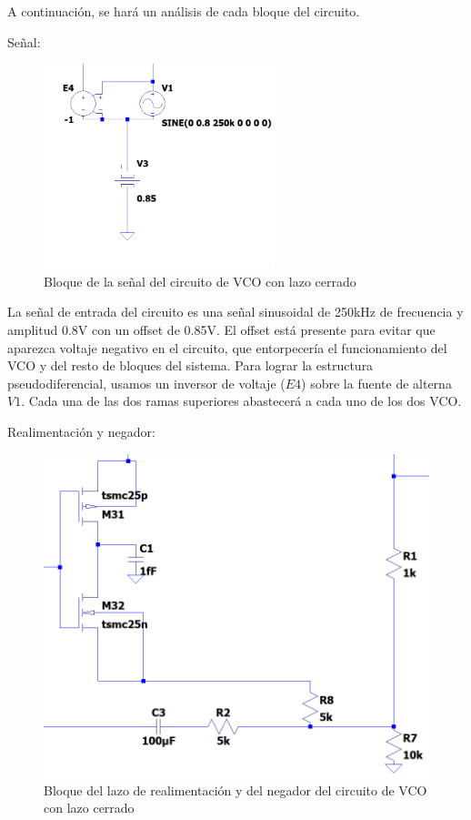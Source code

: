 \documentclass[12pt]{report} %
\begin{document}
	A continuación, se hará un análisis de cada bloque del circuito.
	
	Señal:
	
	\begin{figure}[H]
		\includegraphics[width=0.6\textwidth]{ltspice-vco-closed-signal-block.png}
		\caption[Bloque de la señal del circuito de VCO con lazo cerrado]{Bloque de la señal del circuito de VCO con lazo cerrado}
		\label{fig:ltspice-vco-closed-signal-block.png}
	\end{figure}

	La señal de entrada del circuito es una señal sinusoidal de 250kHz de frecuencia y amplitud 0.8V con un offset de 0.85V. El offset está presente para evitar que aparezca voltaje negativo en el circuito, que entorpecería el funcionamiento del VCO y del resto de bloques del sistema. Para lograr la estructura pseudodiferencial, usamos un inversor de voltaje ($E4$) sobre la fuente de alterna $V1$. Cada una de las dos ramas superiores abastecerá a cada uno de los dos VCO.
	
	Realimentación y negador:
	
	\begin{figure}[H]
		\includegraphics[width=\textwidth]{ltspice-vco-closed-loop-1.png}
		\caption[Bloque del lazo de realimentación y del negador del circuito de VCO con lazo cerrado]{Bloque del lazo de realimentación y del negador del circuito de VCO con lazo cerrado}
		\label{fig:ltspice-vco-closed-loop-1.png}
	\end{figure}
\end{document}
